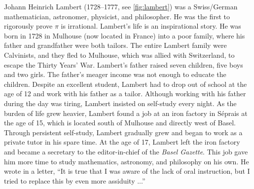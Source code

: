 \documentclass[b5paper]{article}
\begin{document}
\begin{mdframed}
Johann Heinrich Lambert (1728–1777, see \cref{fig:lambert}) was a Swiss/German mathematician, astronomer, physicist, and philosopher. He was the first to rigorously prove $\pi$ is irrational. Lambert's life is an inspirational story. He was born in 1728 in Mulhouse (now located in France) into a poor family, where his father and grandfather were both tailors. The entire Lambert family were Calvinists, and they fled to Mulhouse, which was allied with Switzerland, to escape the Thirty Years' War. Lambert's father raised seven children, five boys and two girls. The father's meager income was not enough to educate the children. Despite an excellent student, Lambert had to drop out of school at the age of 12 and work with his father as a tailor. Although working with his father during the day was tiring, Lambert insisted on self-study every night. As the burden of life grew heavier, Lambert found a job at an iron factory in Séprais at the age of 15, which is located south of Mulhouse and directly west of Basel. Through persistent self-study, Lambert gradually grew and began to work as a private tutor in his spare time. At the age of 17, Lambert left the iron factory and became a secretary to the editor-in-chief of the \emph{Basel Gazette}. This job gave him more time to study mathematics, astronomy, and philosophy on his own. He wrote in a letter, \enquote{It is true that I was aware of the lack of oral instruction, but I tried to replace this by even more assiduity ...}


\end{mdframed}
\end{document}

